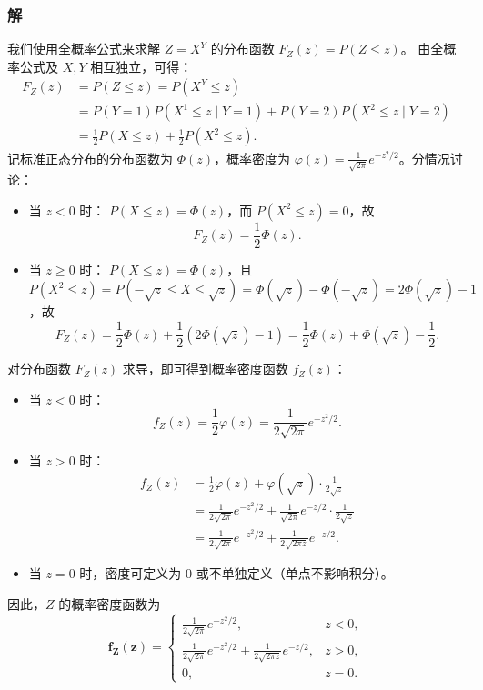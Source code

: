 \documentclass[11pt,a4paper,oneside,openany]{book}
\theoremstyle{yhbthm}
\begin{document}
\subsubsection{解}
我们使用全概率公式来求解 $Z = X^Y$ 的分布函数 $F_Z(z) = P(Z \le z)$。
由全概率公式及 $X,Y$ 相互独立，可得：
\[
\begin{aligned}
F_Z(z) &= P(Z \le z) = P(X^Y \le z) \\
&= P(Y=1)P(X^1 \le z \mid Y=1) + P(Y=2)P(X^2 \le z \mid Y=2) \\
&= \frac{1}{2}P(X \le z) + \frac{1}{2}P(X^2 \le z).
\end{aligned}
\]
记标准正态分布的分布函数为 $\Phi(z)$，概率密度为 $\varphi(z) = \frac{1}{\sqrt{2\pi}}e^{-z^2/2}$。分情况讨论：
\begin{itemize}
  \item 当 $z < 0$ 时：
    $P(X \le z) = \Phi(z)$，而 $P(X^2 \le z) = 0$，故
    \[
    F_Z(z) = \frac{1}{2}\Phi(z).
    \]
  \item 当 $z \ge 0$ 时：
    $P(X \le z) = \Phi(z)$，且 $P(X^2 \le z) = P(-\sqrt{z} \le X \le \sqrt{z}) = \Phi(\sqrt{z}) - \Phi(-\sqrt{z}) = 2\Phi(\sqrt{z}) - 1$，故
    \[
    F_Z(z) = \frac{1}{2}\Phi(z) + \frac{1}{2}\left(2\Phi(\sqrt{z}) - 1\right) = \frac{1}{2}\Phi(z) + \Phi(\sqrt{z}) - \frac{1}{2}.
    \]
\end{itemize}

对分布函数 $F_Z(z)$ 求导，即可得到概率密度函数 $f_Z(z)$：
\begin{itemize}
  \item 当 $z < 0$ 时：
    \[
    f_Z(z) = \frac{1}{2}\varphi(z) = \frac{1}{2\sqrt{2\pi}}e^{-z^2/2}.
    \]
  \item 当 $z > 0$ 时：
    \[
    \begin{aligned}
    f_Z(z) &= \frac{1}{2}\varphi(z) + \varphi(\sqrt{z}) \cdot \frac{1}{2\sqrt{z}} \\
    &= \frac{1}{2\sqrt{2\pi}}e^{-z^2/2} + \frac{1}{\sqrt{2\pi}}e^{-z/2} \cdot \frac{1}{2\sqrt{z}} \\
    &= \frac{1}{2\sqrt{2\pi}}e^{-z^2/2} + \frac{1}{2\sqrt{2\pi z}}e^{-z/2}.
    \end{aligned}
    \]
  \item 当 $z = 0$ 时，密度可定义为 $0$ 或不单独定义（单点不影响积分）。
\end{itemize}

因此，$Z$ 的概率密度函数为
\[
\boldsymbol{f_Z(z)} =
\begin{cases}
\displaystyle \frac{1}{2\sqrt{2\pi}}e^{-z^2/2}, & z < 0, \\[6pt]
\displaystyle \frac{1}{2\sqrt{2\pi}}e^{-z^2/2} + \frac{1}{2\sqrt{2\pi z}}e^{-z/2}, & z > 0, \\[6pt]
0, & z = 0.
\end{cases}
\]
\end{document}
